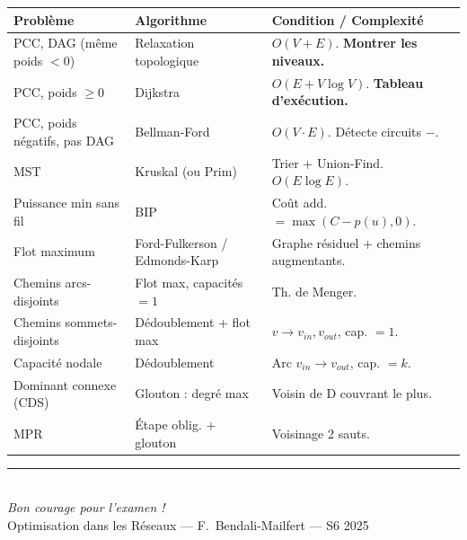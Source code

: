 \documentclass[12pt,a4paper]{article}
\begin{document}
\begin{center}
\renewcommand{\arraystretch}{1.5}
\begin{tabular}{|p{4.5cm}|p{4cm}|p{5cm}|}
\hline
\textbf{Probl\`eme} & \textbf{Algorithme} & \textbf{Condition / Complexit\'e} \\\hline
PCC, DAG (m\^eme poids $< 0$) & Relaxation topologique & $O(V+E)$. \textbf{Montrer les niveaux.} \\\hline
PCC, poids $\geq 0$ & Dijkstra & $O(E + V\log V)$. \textbf{Tableau d'ex\'ecution.} \\\hline
PCC, poids n\'egatifs, pas DAG & Bellman-Ford & $O(V \cdot E)$. D\'etecte circuits $-$. \\\hline
MST & Kruskal (ou Prim) & Trier + Union-Find. $O(E \log E)$. \\\hline
Puissance min sans fil & BIP & Co\^ut add. $= \max(C-p(u), 0)$. \\\hline
Flot maximum & Ford-Fulkerson / Edmonds-Karp & Graphe r\'esiduel + chemins augmentants. \\\hline
Chemins arcs-disjoints & Flot max, capacit\'es $= 1$ & Th. de Menger. \\\hline
Chemins sommets-disjoints & D\'edoublement + flot max & $v \to v_{in}, v_{out}$, cap. $= 1$. \\\hline
Capacit\'e nodale & D\'edoublement & Arc $v_{in} \to v_{out}$, cap. $= k$. \\\hline
Dominant connexe (CDS) & Glouton : degr\'e max & Voisin de D couvrant le plus. \\\hline
MPR & \'Etape oblig. + glouton & Voisinage 2 sauts. \\\hline
\end{tabular}
\end{center}

\vspace{2em}
\begin{center}
\textcolor{titrebleu}{\rule{0.6\textwidth}{1.5pt}}\\[0.5em]
\textit{\Large Bon courage pour l'examen !}\\[0.3em]
\textcolor{defvert}{\small Optimisation dans les R\'eseaux --- F.~Bendali-Mailfert --- S6 2025}
\end{center}
\end{document}
